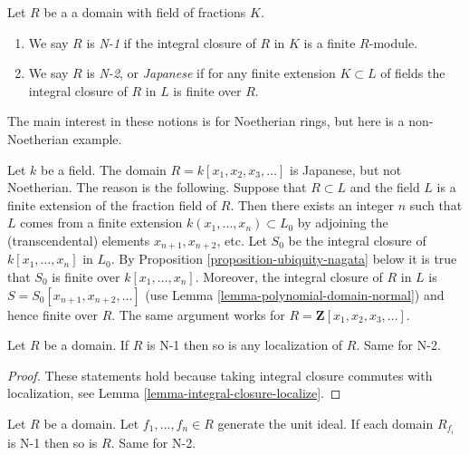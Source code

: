 \begin{definition}
\label{definition-N}
Let $R$ be a a domain with field of fractions $K$.
\begin{enumerate}
\item We say $R$ is {\it N-1} if the integral closure of $R$ in $K$
is a finite $R$-module.
\item We say $R$ is {\it N-2}, or {\it Japanese} if for any finite
extension $K \subset L$ of fields the integral closure of $R$ in $L$
is finite over $R$.
\end{enumerate}
\end{definition}

\noindent
The main interest in these notions is for Noetherian rings,
but here is a non-Noetherian example.

\begin{example}
\label{example-Japanese-not-Noetherian}
Let $k$ be a field. The domain $R = k[x_1, x_2, x_3, \ldots]$ is Japanese,
but not Noetherian. The reason is the following. Suppose that $R \subset L$
and the field $L$ is a finite extension of the fraction field of $R$.
Then there exists an integer $n$ such that $L$ comes from a finite
extension $k(x_1, \ldots, x_n) \subset L_0$ by adjoining
the (transcendental) elements $x_{n + 1}, x_{n + 2}$, etc.
Let $S_0$ be the integral
closure of $k[x_1, \ldots, x_n]$ in $L_0$. By
Proposition \ref{proposition-ubiquity-nagata} below
it is true that $S_0$ is finite over $k[x_1, \ldots, x_n]$.
Moreover, the integral closure of $R$ in $L$ is
$S = S_0[x_{n + 1}, x_{n + 2}, \ldots]$ (use
Lemma \ref{lemma-polynomial-domain-normal}) and
hence finite over $R$. The same argument works for
$R = \mathbf{Z}[x_1, x_2, x_3, \ldots]$.
\end{example}

\begin{lemma}
\label{lemma-localize-N}
Let $R$ be a domain.
If $R$ is N-1 then so is any localization of $R$.
Same for N-2.
\end{lemma}

\begin{proof}
These statements hold because taking integral closure commutes
with localization, see Lemma \ref{lemma-integral-closure-localize}.
\end{proof}

\begin{lemma}
\label{lemma-Japanese-local}
Let $R$ be a domain. Let $f_1, \ldots, f_n \in R$ generate the
unit ideal. If each domain $R_{f_i}$ is N-1 then so is $R$.
Same for N-2.
\end{lemma}

